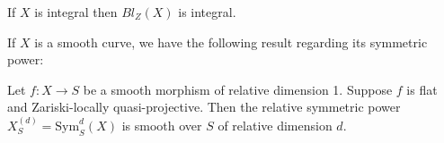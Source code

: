 \begin{theorem}
If $X$ is integral then $Bl_Z(X)$ is integral. %
\end{theorem}


If $X$ is a smooth curve, we have the following result regarding its symmetric power:
    \begin{prop}
        Let $f: X \to S$ be a smooth morphism of relative dimension 1.
        Suppose $f$ is flat and Zariski-locally quasi-projective.
        Then the relative symmetric power $X_S^{(d)} = \text{Sym}^d_S(X)$ is smooth over $S$ of relative dimension $d$.
    \end{prop}
    
